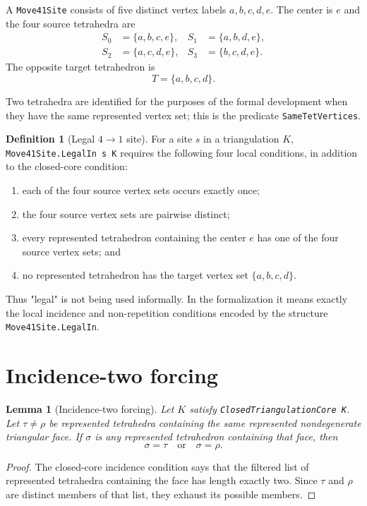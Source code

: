 \documentclass[11pt]{article}
\newtheorem{lemma}[theorem]{Lemma}
\theoremstyle{definition}
\newtheorem{definition}[theorem]{Definition}
\theoremstyle{remark}
\begin{document}
A \texttt{\small Move41Site} consists of five distinct vertex labels
$a,b,c,d,e$.  The center is $e$ and the four source tetrahedra are
\[
\begin{aligned}
S_0&=\{a,b,c,e\},&
S_1&=\{a,b,d,e\},\\
S_2&=\{a,c,d,e\},&
S_3&=\{b,c,d,e\}.
\end{aligned}
\]
The opposite target tetrahedron is
\[
T=\{a,b,c,d\}.
\]

Two tetrahedra are identified for the purposes of the formal development
when they have the same represented vertex set; this is the predicate
\texttt{\small SameTetVertices}.

\begin{definition}[Legal $4\to1$ site]
For a site $s$ in a triangulation $K$, \texttt{\small Move41Site.LegalIn s K}
requires the following four local conditions, in addition to the closed-core
condition:
\begin{enumerate}[label=(\roman*)]
  \item each of the four source vertex sets occurs exactly once;
  \item the four source vertex sets are pairwise distinct;
  \item every represented tetrahedron containing the center $e$ has one of
        the four source vertex sets; and
  \item no represented tetrahedron has the target vertex set
        $\{a,b,c,d\}$.
\end{enumerate}
\end{definition}

Thus "legal" is not being used informally.  In the formalization it means
exactly the local incidence and non-repetition conditions encoded by the
structure \texttt{\small Move41Site.LegalIn}.

\section{Incidence-two forcing}

\begin{lemma}[Incidence-two forcing]
Let $K$ satisfy \texttt{\small ClosedTriangulationCore K}.  Let $\tau\ne\rho$
be represented tetrahedra containing the same represented nondegenerate
triangular face.  If $\sigma$ is any represented tetrahedron containing
that face, then
\[
  \sigma=\tau\quad\text{or}\quad\sigma=\rho.
\]
\end{lemma}

\begin{proof}
The closed-core incidence condition says that the filtered list of
represented tetrahedra containing the face has length exactly two.
Since $\tau$ and $\rho$ are distinct members of that list, they exhaust
its possible members.
\end{proof}
\end{document}
